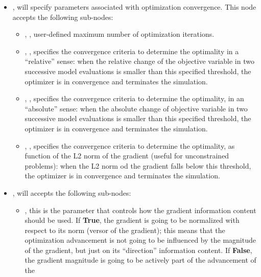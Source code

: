 \constantVariablesDescription
\begin{itemize}
\item {},  will specify parameters associated with optimization 
convergence. This node accepts the following sub-nodes:
  \begin{itemize}
  \item {}, , user-defined maximum number of optimization iterations.
  \item {}, , specifies the convergence criteria to determine the optimality
  in a ``relative'' sense: when the relative change of the objective variable in two successive model evaluations is smaller than 
  this specified threshold, the  optimizer is in convergence and terminates the simulation. 
  \item {}, , specifies the convergence criteria to determine the optimality, 
  in an ``absolute'' sense: when the absolute change of objective variable in two successive model evaluations is smaller 
  than this specified threshold, the  optimizer is in convergence and terminates the simulation. 
   \item {}, , specifies the convergence criteria to determine the optimality, 
   as function of the L2 norm of the gradient (useful for unconstrained problems): when the L2 norm od the gradient falls below this threshold, the  optimizer is in convergence and terminates the simulation.
  \end{itemize}
\item {},  will accepts the following sub-nodes:
  \begin{itemize}
    \item {},  this is the parameter that controls how the gradient information 
    content should be used. If \textbf{True}, the gradient is going to be normalized with respect to its norm (versor of the gradient); 
    this means that the optimization advancement is not going to be influenced by the magnitude of the gradient, but just on its 
    ``direction'' information content. If \textbf{False}, the gradient magnitude is going to be actively part of the advancement of the

\end{itemize}
\end{itemize}
